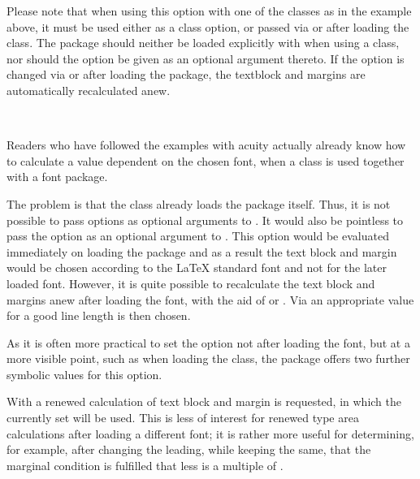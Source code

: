 Please note that when using this option with one of the {\KOMAScript}
classes as in the example above, it must be used either as a class
option, or passed via  or  after
loading the class. The  package should neither be
loaded explicitly with  when using a {\KOMAScript}
class, nor should the option be given as an optional argument
thereto. If the option is changed via  or
 after loading the package, the textblock and
margins are automatically recalculated anew.%
%
%
%

%
%
\begin{Declaration}
  \\
\end{Declaration}%
Readers who have followed the
examples with acuity actually already know how to calculate a
 value dependent on the chosen font, when a {\KOMAScript}
class is used together with a font package.

\begin{Explain}
  The problem is that the {\KOMAScript} class already loads the
   package itself. Thus, it is not possible to pass
  options as optional arguments to . It would also
  be pointless to pass the  option as an
  optional argument to . This option would be
  evaluated immediately on loading the  package and
  as a result the text block and margin would be chosen according to
  the {\LaTeX} standard font and not for the later loaded
  font. However, it is quite possible to recalculate the text block
  and margins anew after loading the font, with the aid of
   or
  . Via
   an appropriate  value for a good line length
  is then chosen.

  As it is often more practical to set the  option not
  after loading the font, but at a more visible point, such as when
  loading the class, the  package offers two further
  symbolic values for this option.
\end{Explain}

With 
a renewed calculation of text block and margin is requested, in which
the currently set  will be used. This is less of interest for
renewed type area calculations after loading a different font; it is
rather more useful for determining, for example, after changing the
leading, while keeping  the same, that the marginal condition
is fulfilled that  less
 is a multiple of .

